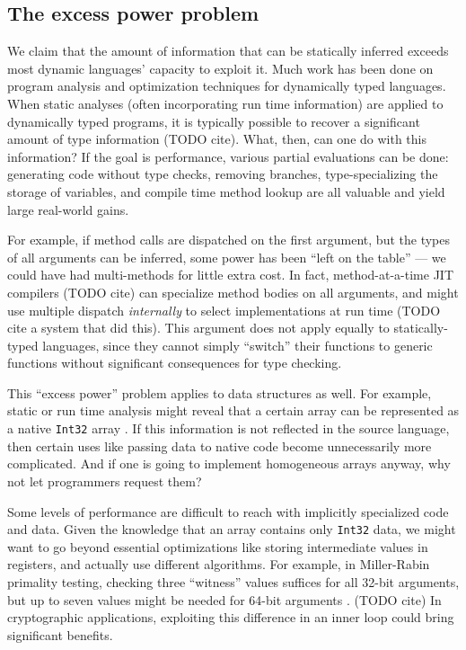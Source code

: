
\subsection{The excess power problem}

We claim that the amount of information that can be statically inferred
exceeds most dynamic languages' capacity to exploit it.
Much work has been done on program analysis and optimization techniques
for dynamically typed languages.
When static analyses (often incorporating run time information) are applied
to dynamically typed programs, it is typically possible to recover a
significant amount of type information (TODO cite).  What, then, can one
do with this information? If the goal is performance, various partial
evaluations can be done: generating code without type checks, removing
branches, type-specializing the storage of variables, and compile time
method lookup are all valuable and yield large real-world gains.

For example,
if method calls are dispatched on the first argument, but the types of all
arguments can be inferred, some power has been ``left on the table'' ---
we could have had multi-methods for little extra cost. In fact, method-at-a-time
JIT compilers (TODO cite)   can specialize method bodies on all arguments,
and might use multiple dispatch \emph{internally} to select implementations
at run time (TODO  cite a system that did this). This argument does not
apply equally to statically-typed languages, since they cannot simply
``switch'' their functions to generic functions without significant
consequences for type checking.

This ``excess power'' problem applies to data structures as well.
For example, static or run time analysis might reveal that a certain array
can be represented as a native \texttt{Int32} array \cite{Bolz2013}.
If this information is not reflected in the source language, then
certain uses like passing data to native code become unnecessarily more
complicated.
And if one is going to implement homogeneous arrays anyway, why not
let programmers request them?

Some levels of performance are difficult to reach with implicitly
specialized code and data. Given the knowledge that
an array contains only \texttt{Int32} data, we might want to go
beyond essential optimizations like storing intermediate values in
registers, and actually use different algorithms. For example,
in Miller-Rabin primality testing, checking three ``witness'' values
suffices for all 32-bit arguments, but up to seven values might be
needed for 64-bit arguments . (TODO cite)
In cryptographic applications, exploiting this difference in an inner loop
could bring significant benefits.


